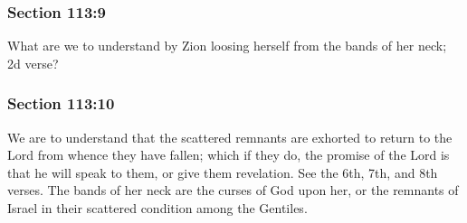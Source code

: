 
	\subsubsection{Section 113:9} %
		\label{DC113-9}

		What are we to understand by Zion loosing herself from the bands of her neck; 2d verse?


	\subsubsection{Section 113:10} %
		\label{DC113-10}

		We are to understand that the scattered remnants are exhorted to return to the Lord from whence they have fallen; which if they do, the promise of the Lord is that he will speak to them, or give them revelation.  See the 6th, 7th, and 8th verses.  The bands of her neck are the curses of God upon her, or the remnants of Israel in their scattered condition among the Gentiles.

